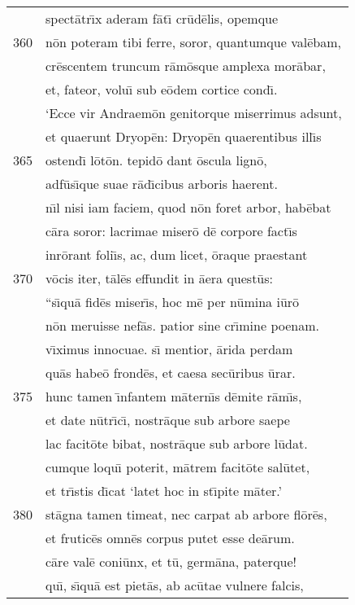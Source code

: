\documentclass[paper=6in:9in,pagesize=pdftex,
               headinclude=on,footinclude=on,12pt]{scrbook}
\begin{document}
\begin{longtable}[p]{ r l }
 & spect\=atr\={\i}x aderam f\=at\={\i} cr\=ud\=elis, opemque\\ 
360 & n\=on poteram tibi ferre, soror, quantumque val\=ebam,\\ 
 & cr\=escentem truncum r\=am\=osque amplexa mor\=abar,\\ 
 & et, fateor, volu\={\i} sub e\=odem cortice cond\={\i}.\\ 
 & \indent `Ecce vir Andraem\=on genitorque miserrimus adsunt,\\ 
 & et quaerunt Dryop\=en: Dryop\=en quaerentibus ill\={\i}s\\ 
365 & ostend\={\i} l\=ot\=on. tepid\=o dant \=oscula lign\=o,\\ 
 & adf\=us\={\i}que suae r\=ad\={\i}cibus arboris haerent.\\ 
 & n\={\i}l nisi iam faciem, quod n\=on foret arbor, hab\=ebat\\ 
 & c\=ara soror: lacrimae miser\=o d\=e corpore fact\={\i}s\\ 
 & inr\=orant foli\={\i}s, ac, dum licet, \=oraque praestant\\ 
370 & v\=ocis iter, t\=al\=es effundit in \=aera quest\=us:\\ 
 & ``s\={\i}qu\=a fid\=es miser\={\i}s, hoc m\=e per n\=umina i\=ur\=o\\ 
 & n\=on meruisse nef\=as. patior sine cr\={\i}mine poenam.\\ 
 & v\={\i}ximus innocuae. s\={\i} mentior, \=arida perdam\\ 
 & qu\=as habe\=o frond\=es, et caesa sec\=uribus \=urar.\\ 
375 & hunc tamen \={\i}nfantem m\=atern\={\i}s d\=emite r\=am\={\i}s,\\ 
 & et date n\=utr\={\i}c\={\i}, nostr\=aque sub arbore saepe\\ 
 & lac facit\=ote bibat, nostr\=aque sub arbore l\=udat.\\ 
 & cumque loqu\={\i} poterit, m\=atrem facit\=ote sal\=utet,\\ 
 & et tr\={\i}stis d\={\i}cat `latet hoc in st\={\i}pite m\=ater.'\\ 
380 & st\=agna tamen timeat, nec carpat ab arbore fl\=or\=es,\\ 
 & et frutic\=es omn\=es corpus putet esse de\=arum.\\ 
 & c\=are val\=e coni\=unx, et t\=u, germ\=ana, paterque!\\ 
 & qu\={\i}, s\={\i}qu\=a est piet\=as, ab ac\=utae vulnere falcis,\\ 

\end{longtable}
\end{document}
